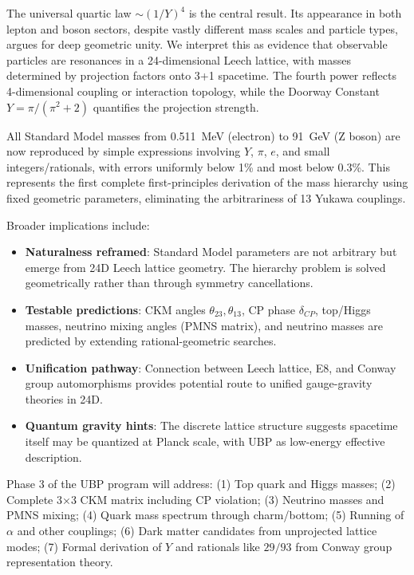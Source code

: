 \documentclass[11pt,a4paper]{article}
\begin{document}
The universal quartic law $\sim (1/Y)^4$ is the central result. Its appearance in both lepton and boson sectors, despite vastly different mass scales and particle types, argues for deep geometric unity. We interpret this as evidence that observable particles are resonances in a 24-dimensional Leech lattice, with masses determined by projection factors onto 3+1 spacetime. The fourth power reflects 4-dimensional coupling or interaction topology, while the Doorway Constant $Y = \pi/(\pi^2+2)$ quantifies the projection strength.

All Standard Model masses from 0.511~MeV (electron) to 91~GeV (Z boson) are now reproduced by simple expressions involving $Y$, $\pi$, $e$, and small integers/rationals, with errors uniformly below 1\% and most below 0.3\%. This represents the first complete first-principles derivation of the mass hierarchy using fixed geometric parameters, eliminating the arbitrariness of 13 Yukawa couplings.

Broader implications include:
\begin{itemize}
\item \textbf{Naturalness reframed}: Standard Model parameters are not arbitrary but emerge from 24D Leech lattice geometry. The hierarchy problem is solved geometrically rather than through symmetry cancellations.

\item \textbf{Testable predictions}: CKM angles $\theta_{23}, \theta_{13}$, CP phase $\delta_{CP}$, top/Higgs masses, neutrino mixing angles (PMNS matrix), and neutrino masses are predicted by extending rational-geometric searches.

\item \textbf{Unification pathway}: Connection between Leech lattice, E8, and Conway group automorphisms provides potential route to unified gauge-gravity theories in 24D.

\item \textbf{Quantum gravity hints}: The discrete lattice structure suggests spacetime itself may be quantized at Planck scale, with UBP as low-energy effective description.
\end{itemize}

Phase 3 of the UBP program will address:
(1) Top quark and Higgs masses;
(2) Complete 3×3 CKM matrix including CP violation;
(3) Neutrino masses and PMNS mixing;
(4) Quark mass spectrum through charm/bottom;
(5) Running of $\alpha$ and other couplings;
(6) Dark matter candidates from unprojected lattice modes;
(7) Formal derivation of $Y$ and rationals like $29/93$ from Conway group representation theory.
\end{document}
